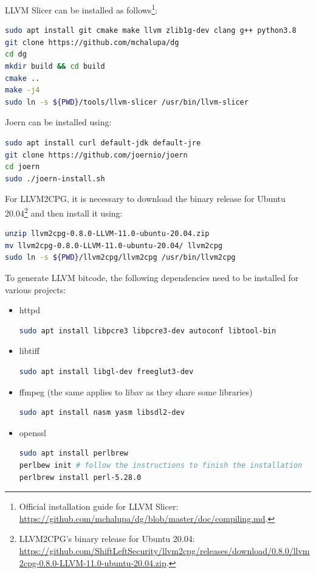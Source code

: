 LLVM Slicer can be installed as follows\footnote{Official installation guide for LLVM Slicer:  \url{https://github.com/mchalupa/dg/blob/master/doc/compiling.md}.}:
\begin{lstlisting}[language=bash, xleftmargin=2em]
sudo apt install git cmake make llvm zlib1g-dev clang g++ python3.8
git clone https://github.com/mchalupa/dg
cd dg
mkdir build && cd build
cmake ..
make -j4
sudo ln -s ${PWD}/tools/llvm-slicer /usr/bin/llvm-slicer
\end{lstlisting}

Joern can be installed using:
\begin{lstlisting}[language=bash, xleftmargin=2em]
sudo apt install curl default-jdk default-jre
git clone https://github.com/joernio/joern
cd joern
sudo ./joern-install.sh
\end{lstlisting}

For LLVM2CPG, it is necessary to download the binary release for Ubuntu 20.04\footnote{LLVM2CPG's binary release for Ubuntu 20.04: \url{https://github.com/ShiftLeftSecurity/llvm2cpg/releases/download/0.8.0/llvm2cpg-0.8.0-LLVM-11.0-ubuntu-20.04.zip}.} and then install it using:
\begin{lstlisting}[language=bash, xleftmargin=2em]
unzip llvm2cpg-0.8.0-LLVM-11.0-ubuntu-20.04.zip
mv llvm2cpg-0.8.0-LLVM-11.0-ubuntu-20.04/ llvm2cpg
sudo ln -s ${PWD}/llvm2cpg/llvm2cpg /usr/bin/llvm2cpg
\end{lstlisting}

To generate LLVM bitcode, the following dependencies need to be installed for various projects:
\begin{itemize}
    \item httpd
\begin{lstlisting}[language=bash, xleftmargin=2em]
sudo apt install libpcre3 libpcre3-dev autoconf libtool-bin
\end{lstlisting}
    \item libtiff
\begin{lstlisting}[language=bash, xleftmargin=2em]
sudo apt install libgl-dev freeglut3-dev
\end{lstlisting}
    \item ffmpeg (the same applies to libav as they share some libraries)
\begin{lstlisting}[language=bash, xleftmargin=2em]
sudo apt install nasm yasm libsdl2-dev
\end{lstlisting}
    \item openssl
\begin{lstlisting}[language=bash, xleftmargin=2em]
sudo apt install perlbrew
perlbew init # follow the instructions to finish the installation
perlbrew install perl-5.28.0
\end{lstlisting}
\end{itemize}


